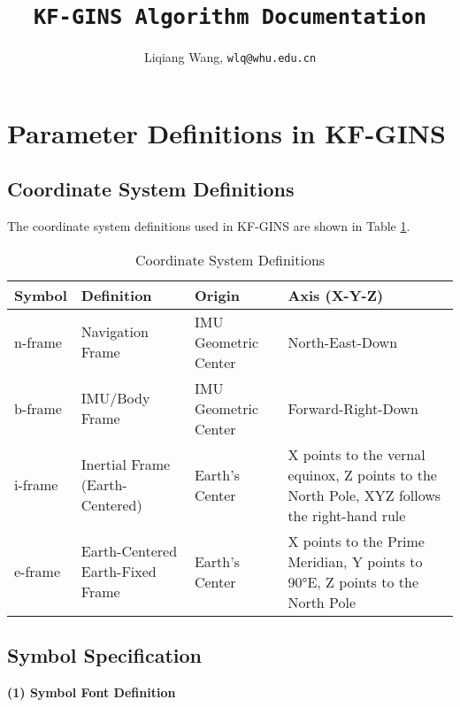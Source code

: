 \documentclass{article}
\title{\texttt{KF-GINS Algorithm Documentation}}
\author{Liqiang Wang, \texttt{wlq@whu.edu.cn}}
\begin{document}
\maketitle


\section{Parameter Definitions in KF-GINS}

\subsection{Coordinate System Definitions}

The coordinate system definitions used in KF-GINS are shown in Table \ref{tab:coordinate-definition}.

\begin{table}[htbp]
	\centering
    \small
    \caption{Coordinate System Definitions}
    \label{tab:coordinate-definition}
	\begin{tabular}{m{1.2cm}<{\centering} m{2.8cm}<{\centering} m{3.5cm}<{\centering} m{6.8cm}<{\centering}}
		\toprule
		Symbol & Definition & Origin & Axis (X-Y-Z)\\
		\midrule
        $\mathrm{n}$-frame & Navigation Frame & IMU Geometric Center & North-East-Down \\
        $\mathrm{b}$-frame & IMU/Body Frame & IMU Geometric Center & Forward-Right-Down \\
        $\mathrm{i}$-frame & Inertial Frame (Earth-Centered) & Earth's Center & X points to the vernal equinox, Z points to the North Pole, XYZ follows the right-hand rule \\
        $\mathrm{e}$-frame & Earth-Centered Earth-Fixed Frame & Earth's Center & X points to the Prime Meridian, Y points to 90°E, Z points to the North Pole \\
        \bottomrule
	\end{tabular}
\end{table}


\subsection{Symbol Specification}

\textbf{(1) Symbol Font Definition}
\end{document}
